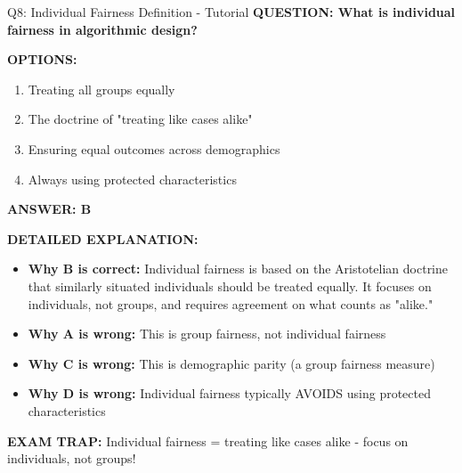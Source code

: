 \documentclass[8pt]{beamer}
\begin{document}
	\begin{frame}{Q8: Individual Fairness Definition - Tutorial}
		\fontsize{6.5}{7.5}\selectfont
		\textbf{QUESTION: What is individual fairness in algorithmic design?}
		
		\vspace{0.1cm}
		\textbf{OPTIONS:}
		\begin{enumerate}
			\item Treating all groups equally
			\item The doctrine of "treating like cases alike"
			\item Ensuring equal outcomes across demographics
			\item Always using protected characteristics
		\end{enumerate}
		
		\vspace{0.1cm}
		\textcolor{myblue}{\textbf{ANSWER: B}}
		
		\vspace{0.1cm}
		\textbf{DETAILED EXPLANATION:}
		\begin{itemize}
			\item \textbf{Why B is correct:} Individual fairness is based on the Aristotelian doctrine that similarly situated individuals should be treated equally. It focuses on individuals, not groups, and requires agreement on what counts as "alike."
			\item \textbf{Why A is wrong:} This is group fairness, not individual fairness
			\item \textbf{Why C is wrong:} This is demographic parity (a group fairness measure)
			\item \textbf{Why D is wrong:} Individual fairness typically AVOIDS using protected characteristics
		\end{itemize}
		
		\textcolor{myred}{\textbf{EXAM TRAP:}} Individual fairness = \textcolor{myblue}{treating like cases alike} - focus on individuals, not groups!
	\end{frame}
	
\end{document}
